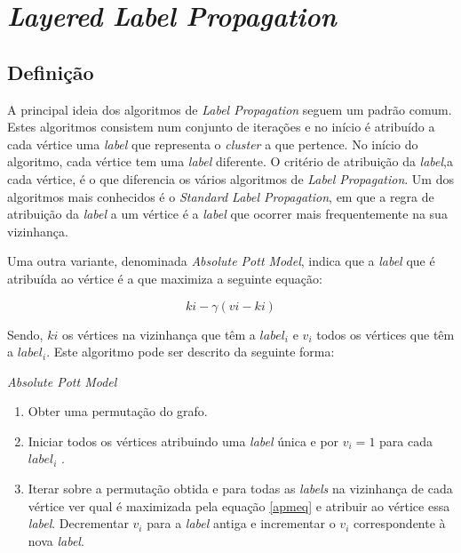 \section{\textit{Layered Label Propagation}}

  \subsection{Definição}
  A principal ideia dos algoritmos de \textit{Label Propagation} seguem um padrão comum. Estes algoritmos consistem num conjunto de iterações e no início é atribuído a cada vértice uma \textit{label} que representa o \textit{cluster} a que pertence. No início do algoritmo, cada vértice tem uma \textit{label} diferente. O critério de atribuição da \textit{label},a cada vértice, é o que diferencia os vários algoritmos de \textit{Label Propagation}. Um dos algoritmos mais conhecidos é o \textit{Standard Label Propagation}, em que a regra de atribuição da \textit{label} a um vértice é a \textit{label} que ocorrer mais frequentemente na sua vizinhança. 
  
  Uma outra variante, denominada \textit{Absolute Pott Model}, indica que a \textit{label} que é atribuída ao vértice é a que maximiza a seguinte equação: 
 
  \begin{center}
    \begin{equation}
      \label{apmeq}
      ki-\gamma(vi-ki)
    \end{equation}
  \end{center}    
  
  Sendo, $ki$ os vértices na vizinhança que têm a $label_i$ e $v_i$ todos os vértices que têm a $label_i$.
  Este algoritmo pode ser descrito da seguinte forma:
  
  \begin{algorithm}
    \caption{\textit{Absolute Pott Model}}\label{apmalg}
    \begin{enumerate}
    \item Obter uma permutação do grafo.
    \item Iniciar todos os vértices atribuindo uma \textit{label} única e por $v_i=1$ para cada $label_i$ .
    \item Iterar sobre a permutação obtida e para todas as \textit{labels} na vizinhança de cada vértice ver qual é maximizada pela equação \ref{apmeq} e atribuir ao vértice essa \textit{label}. Decrementar $v_i$ para a \textit{label} antiga e incrementar o $v_i$ correspondente à nova \textit{label}.
    \end{enumerate}
  \end{algorithm}

